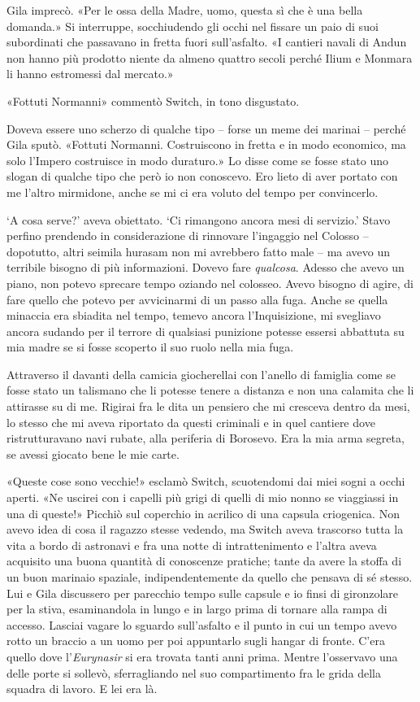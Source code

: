 Gila imprecò. «Per le ossa della Madre, uomo, questa sì che è una bella
domanda.» Si interruppe, socchiudendo gli occhi nel fissare un paio di
suoi subordinati che passavano in fretta fuori sull'asfalto. «I cantieri
navali di Andun non hanno più prodotto niente da almeno quattro secoli
perché Ilium e Monmara li hanno estromessi dal mercato.»

«Fottuti Normanni» commentò Switch, in tono disgustato.

Doveva essere uno scherzo di qualche tipo -- forse un meme dei marinai
-- perché Gila sputò. «Fottuti Normanni. Costruiscono in fretta e in
modo economico, ma solo l'Impero costruisce in modo duraturo.» Lo disse
come se fosse stato uno slogan di qualche tipo che però io non
conoscevo. Ero lieto di aver portato con me l'altro mirmidone, anche se
mi ci era voluto del tempo per convincerlo.

`A cosa serve?' aveva obiettato. `Ci rimangono ancora mesi di servizio.'
Stavo perfino prendendo in considerazione di rinnovare l'ingaggio nel
Colosso -- dopotutto, altri seimila hurasam non mi avrebbero fatto male
-- ma avevo un terribile bisogno di più informazioni. Dovevo fare
\emph{qualcosa}. Adesso che avevo un piano, non potevo sprecare tempo
oziando nel colosseo. Avevo bisogno di agire, di fare quello che potevo
per avvicinarmi di un passo alla fuga. Anche se quella minaccia era
sbiadita nel tempo, temevo ancora l'Inquisizione, mi svegliavo ancora
sudando per il terrore di qualsiasi punizione potesse essersi abbattuta
su mia madre se si fosse scoperto il suo ruolo nella mia fuga.

Attraverso il davanti della camicia giocherellai con l'anello di
famiglia come se fosse stato un talismano che li potesse tenere a
distanza e non una calamita che li attirasse su di me. Rigirai fra le
dita un pensiero che mi cresceva dentro da mesi, lo stesso che mi aveva
riportato da questi criminali e in quel cantiere dove ristrutturavano
navi rubate, alla periferia di Borosevo. Era la mia arma segreta, se
avessi giocato bene le mie carte.

«Queste cose sono vecchie!» esclamò Switch, scuotendomi dai miei sogni a
occhi aperti. «Ne uscirei con i capelli più grigi di quelli di mio nonno
se viaggiassi in una di queste!» Picchiò sul coperchio in acrilico di
una capsula criogenica. Non avevo idea di cosa il ragazzo stesse
vedendo, ma Switch aveva trascorso tutta la vita a bordo di astronavi e
fra una notte di intrattenimento e l'altra aveva acquisito una buona
quantità di conoscenze pratiche; tante da avere la stoffa di un buon
marinaio spaziale, indipendentemente da quello che pensava di sé stesso.
Lui e Gila discussero per parecchio tempo sulle capsule e io finsi di
gironzolare per la stiva, esaminandola in lungo e in largo prima di
tornare alla rampa di accesso. Lasciai vagare lo sguardo sull'asfalto e
il punto in cui un tempo avevo rotto un braccio a un uomo per poi
appuntarlo sugli hangar di fronte. C'era quello dove l'\emph{Eurynasir}
si era trovata tanti anni prima. Mentre l'osservavo una delle porte si
sollevò, sferragliando nel suo compartimento fra le grida della squadra
di lavoro. E lei era là.

